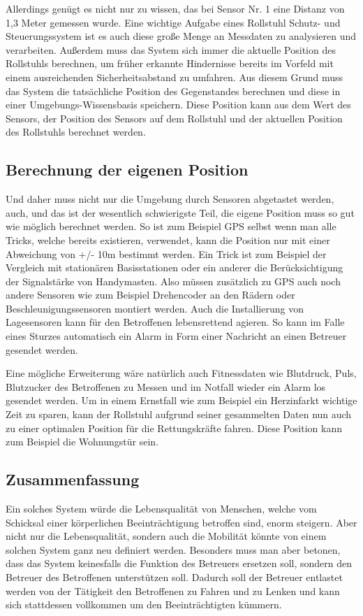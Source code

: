 Allerdings genügt es nicht nur zu wissen, das bei Sensor Nr. 1 eine Distanz von 1,3 Meter gemessen wurde.
Eine wichtige Aufgabe eines Rollstuhl Schutz- und Steuerungssystem ist es auch diese große Menge an Messdaten zu analysieren und verarbeiten.
Außerdem muss das System sich immer die aktuelle Position des Rollstuhls berechnen, um früher erkannte Hindernisse bereits im Vorfeld mit einem ausreichenden Sicherheitsabstand zu umfahren.
Aus diesem Grund muss das System die tatsächliche Position des Gegenstandes berechnen und diese in einer Umgebungs-Wissensbasis speichern.
Diese Position kann aus dem Wert des Sensors, der Position des Sensors auf dem Rollstuhl und der aktuellen Position des Rollstuhls berechnet werden.


\subsection{Berechnung der eigenen Position}
Und daher muss nicht nur die Umgebung durch Sensoren abgetastet werden, auch, und das ist der wesentlich schwierigste Teil, die eigene Position muss so gut wie möglich berechnet werden.
So ist zum Beispiel GPS selbst wenn man alle Tricks, welche bereits existieren, verwendet, kann die Position nur mit einer Abweichung von +/- 10m bestimmt werden.
Ein Trick ist zum Beispiel der Vergleich mit stationären Basisstationen oder ein anderer die Berücksichtigung der Signalstärke von Handymasten.
Also müssen zusätzlich zu GPS auch noch andere Sensoren wie zum Beispiel Drehencoder an den Rädern oder Beschleunigungssensoren montiert werden.
Auch die Installierung von Lagesensoren kann für den Betroffenen lebensrettend agieren.
So kann im Falle eines Sturzes automatisch ein Alarm in Form einer Nachricht an einen Betreuer gesendet werden.

Eine mögliche Erweiterung wäre natürlich auch Fitnessdaten wie Blutdruck, Puls, Blutzucker des Betroffenen zu Messen und im Notfall wieder ein Alarm los gesendet werden.
Um in einem Ernstfall wie zum Beispiel ein Herzinfarkt wichtige Zeit zu sparen, kann der Rollstuhl aufgrund seiner gesammelten Daten nun auch zu einer optimalen Position für die Rettungskräfte fahren.
Diese Position kann zum Beispiel die Wohnungstür sein.


\subsection{Zusammenfassung}
Ein solches System würde die Lebensqualität von Menschen, welche vom Schicksal einer körperlichen Beeinträchtigung betroffen sind, enorm steigern.
Aber nicht nur die Lebensqualität, sondern auch die Mobilität könnte von einem solchen System ganz neu definiert werden.
Besonders muss man aber betonen, dass das System keinesfalls die Funktion des Betreuers ersetzen soll, sondern den Betreuer des Betroffenen unterstützen soll.
Dadurch soll der Betreuer entlastet werden von der Tätigkeit den Betroffenen zu Fahren und zu Lenken und kann sich stattdessen vollkommen um den Beeinträchtigten kümmern.


